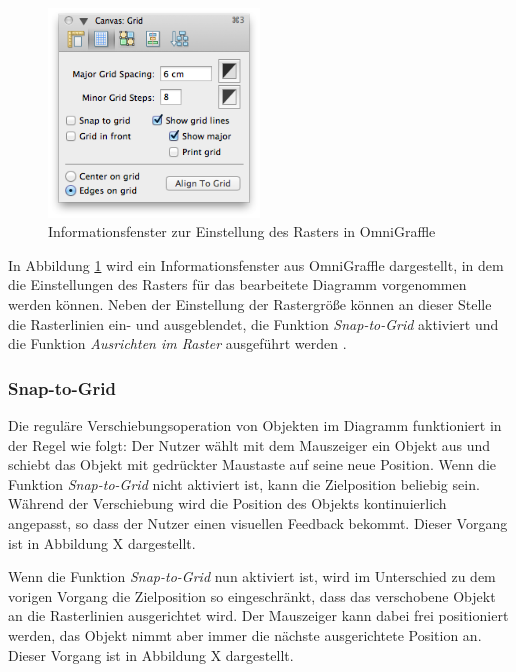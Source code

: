 \begin{figure}[hbt]
    \centering
    \includegraphics[width=0.5\textwidth]{resources/omnigraffle-grid-settings.png}
    \caption{Informationsfenster zur Einstellung des Rasters in OmniGraffle}
    \label{fig:omnigraffle-grid-settings}
\end{figure}

In Abbildung \ref{fig:omnigraffle-grid-settings} wird ein Informationsfenster aus OmniGraffle dargestellt, in dem die Einstellungen des Rasters für das bearbeitete Diagramm vorgenommen werden können. Neben der Einstellung der Rastergröße können an dieser Stelle die Rasterlinien ein- und ausgeblendet, die Funktion \textit{Snap-to-Grid} aktiviert und die Funktion \textit{Ausrichten im Raster} ausgeführt werden \cite{08OmniGraffle}.

\subsubsection{Snap-to-Grid}

Die reguläre Verschiebungsoperation von Objekten im Diagramm funktioniert in der Regel wie folgt: Der Nutzer wählt mit dem Mauszeiger ein Objekt aus und schiebt das Objekt mit gedrückter Maustaste auf seine neue Position. Wenn die Funktion \textit{Snap-to-Grid} nicht aktiviert ist, kann die Zielposition beliebig sein. Während der Verschiebung wird die Position des Objekts kontinuierlich angepasst, so dass der Nutzer einen visuellen Feedback bekommt. Dieser Vorgang ist in Abbildung X dargestellt.


Wenn die Funktion \textit{Snap-to-Grid} nun aktiviert ist, wird im Unterschied zu dem vorigen Vorgang die Zielposition so eingeschränkt, dass das verschobene Objekt an die Rasterlinien ausgerichtet wird. Der Mauszeiger kann dabei frei positioniert werden, das Objekt nimmt aber immer die nächste ausgerichtete Position an. Dieser Vorgang ist in Abbildung X dargestellt.

